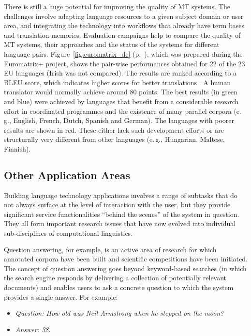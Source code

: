 \documentclass[]{../../metanetpaper}
\begin{document}
\begin{multicols}{2}
There is still a huge potential for improving the quality of MT systems. The challenges involve adapting language resources to a given subject domain or user area, and integrating the technology into workflows that already have term bases and translation memories.
Evaluation campaigns help to compare the quality of MT systems, their approaches and the status of the systems for different language pairs. Figure~\ref{fig:euromatrix_de} (p.~\pageref{fig:euromatrix_de}), which was prepared during the Euromatrix+ project, shows the pair-wise performances obtained for 22 of the 23 EU languages (Irish was not compared). The results are ranked according to a BLEU score, which indicates higher scores for better translations \cite{bleu1}. A human translator would normally achieve around 80 points. The best results (in green and blue) were achieved by languages that benefit from a considerable research effort in coordinated programmes and the existence of many parallel corpora (e.\,g., English, French, Dutch, Spanish and German). The languages with poorer results are shown in red. These either lack such development efforts or are structurally very different from other languages (e.\,g., Hungarian, Maltese, Finnish).

\subsection{Other Application Areas}

Building language technology applications involves a range of subtasks that do not always surface at the level of interaction with the user, but they provide significant service functionalities “behind the scenes” of the system in question. They all form important research issues that have now evolved into individual sub-disciplines of computational linguistics. 

Question answering, for example, is an active area of research for which annotated corpora have been built and scientific competitions have been initiated. The concept of question answering goes beyond keyword-based searches (in which the search engine responds by delivering a collection of potentially relevant documents) and enables users to ask a concrete question to which the system provides a single answer. For example:

\begin{itemize}
\item[] \textit{Question: How old was Neil Armstrong when he stepped on the moon?}
\item[] \textit{Answer: 38.}
\end{itemize}


\end{multicols}
\end{document}
